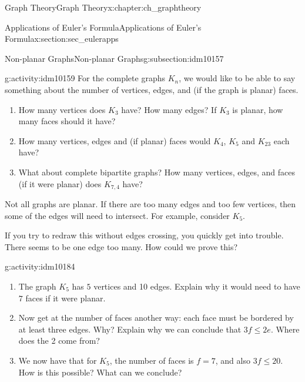 \documentclass[oneside,10pt,]{book}
\numberwithin{equation}{chapter}
\newcommand{\vtx}[2]{node[fill,circle,inner sep=0pt, minimum size=4pt,label=#1:#2]{}}
\renewcommand{\v}{\vtx{above}{}}
\begin{document}
\begin{chapterptx}{Graph Theory}{}{Graph Theory}{}{}{x:chapter:ch_graphtheory}
\begin{sectionptx}{Applications of Euler's Formula}{}{Applications of Euler's Formula}{}{}{x:section:sec_eulerapps}
\begin{subsectionptx}{Non-planar Graphs}{}{Non-planar Graphs}{}{}{g:subsection:idm10157}
\begin{activity}{}{g:activity:idm10159}%
For the complete graphs \(K_n\), we would like to be able to say something about the number of vertices, edges, and (if the graph is planar) faces.%
\begin{enumerate}[font=\bfseries,label=(\alph*),ref=\alph*]
\item{}How many vertices does \(K_3\) have? How many edges?  If \(K_3\) is planar, how many faces should it have?%
\item{}How many vertices, edges and (if planar) faces would \(K_4\), \(K_5\) and \(K_{23}\) each have?%
\item{}What about complete bipartite graphs? How many vertices, edges, and faces (if it were planar) does \(K_{7,4}\) have?%
\end{enumerate}
\end{activity}
Not all graphs are planar. If there are too many edges and too few vertices, then some of the edges will need to intersect. For example, consider \(K_5\).%
\begin{sidebyside}{1}{0.4}{0.4}{0}%
\begin{sbspanel}{0.2}%
\resizebox{\linewidth}{!}{%
\begin{tikzpicture}
          \foreach \x in {0,...,4}
          \draw (\x*72+18:1) \v -- (\x*72+90:1) -- (\x*72-54:1);
        \end{tikzpicture}
}%
\end{sbspanel}%
\end{sidebyside}%
\par
If you try to redraw this without edges crossing, you quickly get into trouble. There seems to be one edge too many. How could we prove this?%
\begin{activity}{}{g:activity:idm10184}%
\begin{enumerate}[font=\bfseries,label=(\alph*),ref=\alph*]
\item{}The graph \(K_5\) has \(5\) vertices and 10 edges.  Explain why it would need to have \(7\) faces if it were planar.%
\item{}Now get at the number of faces another way: each face must be bordered by at least three edges.  Why?  Explain why we can conclude that \(3f \le 2e\).  Where does the 2 come from?%
\item{}We now have that for \(K_5\), the number of faces is \(f = 7\), and also \(3f \le 20\).  How is this possible?  What can we conclude?%
\end{enumerate}
\end{activity}

\end{subsectionptx}
\end{sectionptx}
\end{chapterptx}
\end{document}
